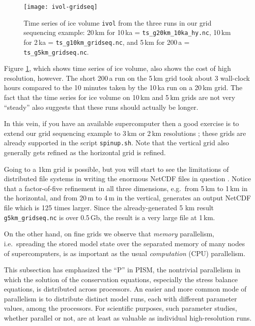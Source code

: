 \begin{figure}[ht]
\centering
\texttt{[image: ivol-gridseq]}
\caption{Time series of ice volume \texttt{ivol} from the three runs in our grid sequencing example: 20\,km for 10\,ka = \texttt{ts_g20km_10ka_hy.nc}, 10\,km for 2\,ka = \texttt{ts_g10km_gridseq.nc}, and 5\,km for 200\,a = \texttt{ts_g5km_gridseq.nc}.}
\label{fig:ivolgridseq}
\end{figure}

Figure \ref{fig:ivolgridseq}, which shows time series of ice volume, also shows the cost of high resolution, however.  The short 200\,a run on the 5\,km grid took about 3 wall-clock hours compared to the 10 minutes taken by the 10\,ka run on a 20\,km grid.  The fact that the time series for ice volume on 10\,km and 5\,km grids are not very ``steady'' also suggests that these runs should actually be longer.

In this vein, if you have an available supercomputer then a good exercise is to extend our grid sequencing example to 3\,km or 2\,km resolutions \cite{AschwandenAdalgeirsdottirKhroulev}; these grids are already supported in the script \texttt{spinup.sh}.  Note that the vertical grid also generally gets refined as the horizontal grid is refined.

Going to a 1km grid is possible, but you will start to see the limitations of distributed file systems in writing the enormous NetCDF files in question \cite{DickensMorey2013}.  Notice that a factor-of-five refinement in all three dimensions, e.g.~from 5\,km to 1\,km in the horizontal, and from 20\,m to 4\,m in the vertical, generates an output NetCDF file which is 125 times larger.  Since the already-generated 5 km result \texttt{g5km_gridseq.nc} is over 0.5\,Gb, the result is a very large file at 1\,km.

On the other hand, on fine grids we observe that \emph{memory} parallelism, i.e.~spreading the stored model state over the separated memory of many nodes of supercomputers, is as important as the usual \emph{computation} (CPU) parallelism.

This subsection has emphasized the ``P'' in PISM, the nontrivial parallelism in which the solution of the conservation equations, especially the stress balance equations, is distributed across processors.  An easier and more common mode of parallelism is to distribute distinct model runs, each with different parameter values, among the processors.  For scientific purposes, such parameter studies, whether parallel or not, are at least as valuable as individual high-resolution runs.


